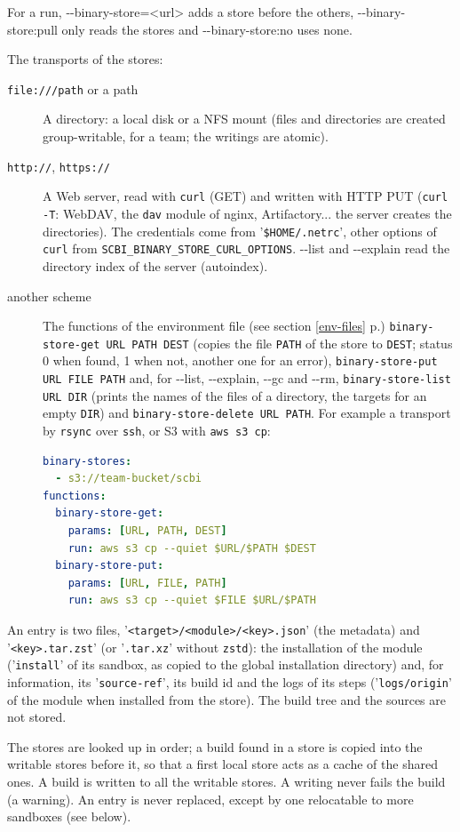 \documentclass[a4paper,12pt,twoside]{article}
\newcommand{\code}[1]{\texttt{#1}}
\newcommand{\seeref}[1]{see section \ref{#1} p.\pageref{#1}}
\newcommand{\file}[1]{'{\texttt{#1}}'}
\newcommand{\ddash}{-{}-}
\begin{document}
For a run, \ddash{}binary-store=<url> adds a store before the others, \ddash{}binary-store:pull only reads the stores and \ddash{}binary-store:no uses none.

The transports of the stores:
\begin{description}
	\item[\code{file:///path} or a path] A directory: a local disk or a NFS mount (files and directories are created group-writable, for a team; the writings are atomic).
	\item[\code{http://}, \code{https://}] A Web server, read with \code{curl} (GET) and written with HTTP PUT (\code{curl -T}: WebDAV, the \code{dav} module of nginx, Artifactory... the server creates the directories). The credentials come from \file{\$HOME/.netrc}, other options of \code{curl} from \code{SCBI\_BINARY\_STORE\_CURL\_OPTIONS}. \ddash{}list and \ddash{}explain read the directory index of the server (autoindex).
	\item[another scheme] The functions of the environment file (\seeref{env-files}) \code{binary-store-get URL PATH DEST} (copies the file \code{PATH} of the store to \code{DEST}; status 0 when found, 1 when not, another one for an error), \code{binary-store-put URL FILE PATH} and, for \ddash{}list, \ddash{}explain, \ddash{}gc and \ddash{}rm, \code{binary-store-list URL DIR} (prints the names of the files of a directory, the targets for an empty \code{DIR}) and \code{binary-store-delete URL PATH}. For example a transport by \code{rsync} over \code{ssh}, or S3 with \code{aws s3 cp}:
\begin{lstlisting}[language={yaml}]
binary-stores:
  - s3://team-bucket/scbi
functions:
  binary-store-get:
    params: [URL, PATH, DEST]
    run: aws s3 cp --quiet $URL/$PATH $DEST
  binary-store-put:
    params: [URL, FILE, PATH]
    run: aws s3 cp --quiet $FILE $URL/$PATH
\end{lstlisting}
\end{description} An entry is two files, \file{<target>/<module>/<key>.json} (the metadata) and \file{<key>.tar.zst} (or \file{.tar.xz} without \code{zstd}): the installation of the module (\file{install} of its sandbox, as copied to the global installation directory) and, for information, its \file{source-ref}, its build id and the logs of its steps (\file{logs/origin} of the module when installed from the store). The build tree and the sources are not stored.

The stores are looked up in order; a build found in a store is copied into the writable stores before it, so that a first local store acts as a cache of the shared ones. A build is written to all the writable stores. A writing never fails the build (a warning). An entry is never replaced, except by one relocatable to more sandboxes (see below).
\end{document}
